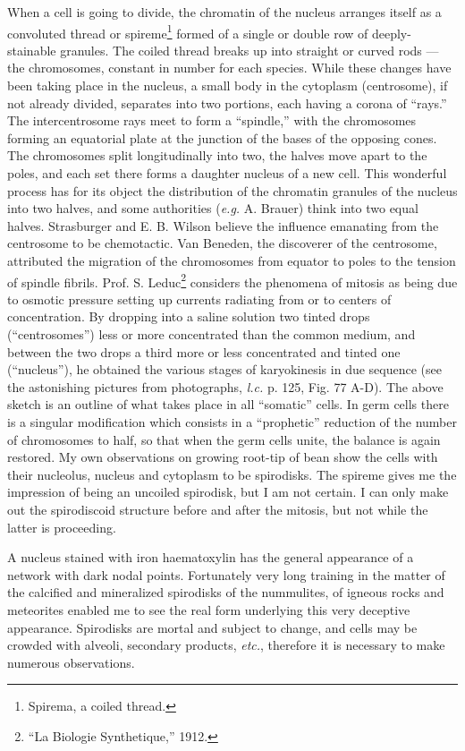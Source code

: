 \documentclass[a4paper, 12pt, oneside]{article}
\begin{document}
When a cell is going to divide, the chromatin of the nucleus arranges itself as a convoluted thread or spireme\footnote{Spirema, a coiled thread.} formed of a single or double row of deeply-stainable granules. The coiled thread breaks up into straight or curved rods --- the chromosomes, constant in number for each species. While these changes have been taking place in the nucleus, a small body in the cytoplasm (centrosome), if not already divided, separates into two portions, each having a corona of ``rays.'' The intercentrosome rays meet to form a ``spindle,'' with the chromosomes forming an equatorial plate at the junction of the bases of the opposing cones. The chromosomes split longitudinally into two, the halves move apart to the poles, and each set there forms a daughter nucleus of a new cell. This wonderful process has for its object the distribution of the chromatin granules of the nucleus into two halves, and some authorities (\emph{e.g.} A. Brauer) think into two equal halves. Strasburger and E. B. Wilson believe the influence emanating from the centrosome to be chemotactic. Van Beneden, the discoverer of the centrosome, attributed the migration of the chromosomes from equator to poles to the tension of spindle fibrils. Prof. S. Leduc\footnote{``La Biologie Synthetique,'' 1912.} considers the phenomena of mitosis as being due to osmotic pressure setting up currents radiating from or to centers of concentration. By dropping into a saline solution two tinted drops (``centrosomes'') less or more concentrated than the common medium, and between the two drops a third more or less concentrated and tinted one (``nucleus''), he obtained the various stages of karyokinesis in due sequence (see the astonishing pictures from photographs, \emph{l.c.} p. 125, Fig. 77 A-D). The above sketch is an outline of what takes place in all ``somatic'' cells. In germ cells there is a singular modification which consists in a ``prophetic'' reduction of the number of chromosomes to half, so that when the germ cells unite, the balance is again restored. My own observations on growing root-tip of bean show the cells with their nucleolus, nucleus and cytoplasm to be spirodisks. The spireme gives me the impression of being an uncoiled spirodisk, but I am not certain. I can only make out the spirodiscoid structure before and after the mitosis, but not while the latter is proceeding.

A nucleus stained with iron haematoxylin has the general appearance of a network with dark nodal points. Fortunately very long training in the matter of the calcified and mineralized spirodisks of the nummulites, of igneous rocks and meteorites enabled me to see the real form underlying this very deceptive appearance. Spirodisks are mortal and subject to change, and cells may be crowded with alveoli, secondary products, \emph{etc.}, therefore it is necessary to make numerous observations.
\end{document}
